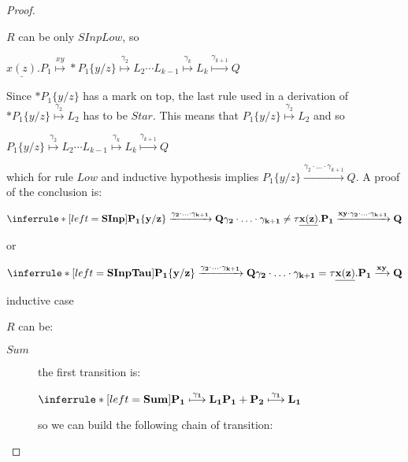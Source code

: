 \begin{proposition}
\begin{proof}
\begin{description}
	\end{description}
	    $R$ can be only $SInpLow$, so 
	    \begin{center}
	      $\underline{x(z)}.P_{1} \stackrel{xy}{\longmapsto} *P_{1}\{y/z\} \stackrel{\gamma_{2}}{\longmapsto} L_{2} \cdots L_{k-1} \stackrel{\gamma_{k}}{\longmapsto} L_{k} \stackrel{\gamma_{k+1}}{\longmapsto} Q$ 
	    \end{center}
	    Since $*P_{1}\{y/z\}$ has a mark on top, the last rule used in a derivation of $ *P_{1}\{y/z\} \stackrel{\gamma_{2}}{\longmapsto} L_{2}$ has to be $Star$. This means that $P_{1}\{y/z\} \stackrel{\gamma_{2}}{\longmapsto} L_{2}$ and so
	    \begin{center}
	      $P_{1}\{y/z\} \stackrel{\gamma_{2}}{\longmapsto} L_{2} \cdots L_{k-1} \stackrel{\gamma_{k}}{\longmapsto} L_{k} \stackrel{\gamma_{k+1}}{\longmapsto} Q$ 
	    \end{center} 
	    which for rule $Low$ and inductive hypothesis implies $P_{1}\{y/z\} \xrightarrow{\gamma_{2}\cdot \ldots \cdot \gamma_{k+1}} Q$. A proof of the conclusion is:
	    \begin{center}
	      $\inferrule* [left=\bf{SInp}]{
		  P_{1}\{y/z\} \xrightarrow{\gamma_{2}\cdot \ldots \cdot \gamma_{k+1}} Q
		\\
		  \gamma_{2}\cdot \ldots \cdot \gamma_{k+1} \neq \tau
	      }{
		\underline{x(z)}.P_{1} \xrightarrow{xy \cdot \gamma_{2}\cdot \ldots \cdot \gamma_{k+1}} Q
	      }$
	    \end{center}
	    or
	    \begin{center}
	      $\inferrule* [left=\bf{SInpTau}]{
		  P_{1}\{y/z\} \xrightarrow{\gamma_{2}\cdot \ldots \cdot \gamma_{k+1}} Q
		\\
		  \gamma_{2}\cdot \ldots \cdot \gamma_{k+1} = \tau
	      }{
		\underline{x(z)}.P_{1} \xrightarrow{xy} Q
	      }$
	    \end{center}
	\begin{description}
	  \item[inductive case] 
	\end{description}
	    $R$ can be:
	    \begin{description}
	      \item[$Sum$] the first transition is:
		\begin{center}
		  $\inferrule* [left=\bf{Sum}]{
		      P_{1} \stackrel{\gamma_{1}}{\longmapsto} L_{1}
		    }{
		      P_{1}+P_{2} \stackrel{\gamma_{1}}{\longmapsto} L_{1}
		  }$ 
		\end{center}
		so we can build the following chain of transition:

\end{description}
\end{proof}
\end{proposition}
